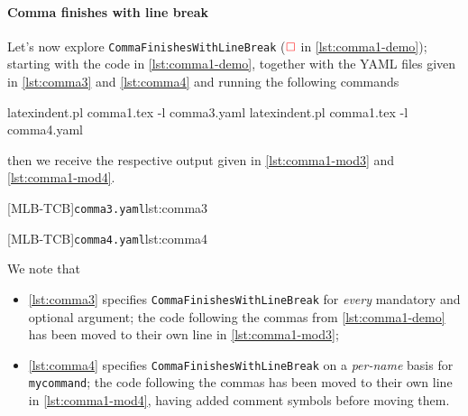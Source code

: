  \paragraph{Comma finishes with line break}
  \begin{example}
  Let's now explore \texttt{CommaFinishesWithLineBreak} ($\color{red}\square$ in
  \cref{lst:comma1-demo}); starting with the code in \cref{lst:comma1-demo}, together
  with the YAML files given in \cref{lst:comma3} and \cref{lst:comma4} and running the
  following commands 
   

  \begin{commandshell}
latexindent.pl comma1.tex -l comma3.yaml
latexindent.pl comma1.tex -l comma4.yaml
\end{commandshell}

  then we receive the respective output given in \cref{lst:comma1-mod3} and
  \cref{lst:comma1-mod4}.

  \begin{cmhtcbraster}
   [MLB-TCB]{\texttt{comma3.yaml}}{lst:comma3}
  \end{cmhtcbraster}

  \begin{cmhtcbraster}
   [MLB-TCB]{\texttt{comma4.yaml}}{lst:comma4}
  \end{cmhtcbraster}

  We note that
  \begin{itemize}
   \item \cref{lst:comma3} specifies \texttt{CommaFinishesWithLineBreak} for
         \emph{every} mandatory and optional argument;
         the code following the commas from \cref{lst:comma1-demo} has been moved to
         their own line in \cref{lst:comma1-mod3};
   \item \cref{lst:comma4} specifies \texttt{CommaFinishesWithLineBreak} on a
         \emph{per-name} basis for \texttt{mycommand};
         the code following the commas has been moved to
         their own line in \cref{lst:comma1-mod4}, having added comment symbols before moving
         them.
  \end{itemize}
  \end{example}

